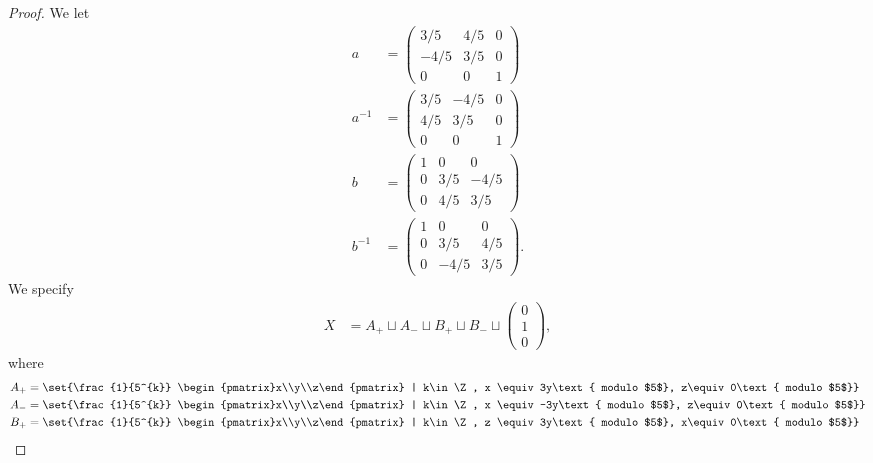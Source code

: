 \begin{proof}
  We let
  \begin{align*}
    a &= \begin{pmatrix}3/5 & 4/5 & 0 \\ -4/5 & 3/5 & 0 \\ 0 & 0 & 1\end{pmatrix}\\
    a^{-1} &= \begin{pmatrix}3/5 & -4/5 & 0 \\ 4/5 & 3/5 & 0 \\ 0 & 0 & 1\end{pmatrix}\\
    b &= \begin{pmatrix}1 & 0 & 0 \\ 0 & 3/5 & -4/5 \\ 0 & 4/5 & 3/5\end{pmatrix}\\
    b^{-1} &= \begin{pmatrix}1 & 0 & 0 \\ 0 & 3/5 & 4/5 \\ 0 & -4/5 & 3/5\end{pmatrix}.
  \end{align*}
  We specify
  \begin{align*}
    X &= A_{+} \sqcup A_{-} \sqcup B_{+} \sqcup B_{-} \sqcup \begin{pmatrix}0\\1\\0\end{pmatrix},
  \end{align*}
  where
  \begin{align*}
    A_{+} &= \set{\frac{1}{5^{k}} \begin{pmatrix}x\\y\\z\end{pmatrix} | k\in \Z, x \equiv 3y\text{ modulo $5$}, z\equiv0\text{ modulo $5$}}\\
    A_{-} &= \set{\frac{1}{5^{k}} \begin{pmatrix}x\\y\\z\end{pmatrix} | k\in \Z, x \equiv -3y\text{ modulo $5$}, z\equiv 0\text{ modulo $5$}}\\
    B_{+} &= \set{\frac{1}{5^{k}} \begin{pmatrix}x\\y\\z\end{pmatrix} | k\in \Z, z \equiv 3y\text{ modulo $5$}, x\equiv 0\text{ modulo $5$}}\\

\end{align*}
\end{proof}
